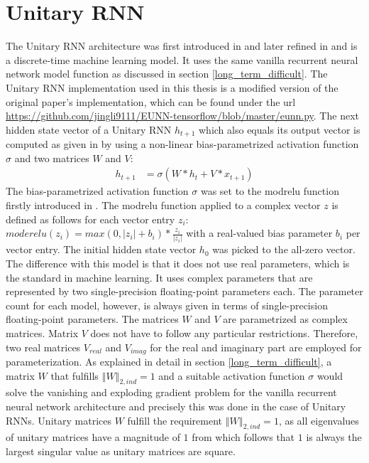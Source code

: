 \documentclass[draft,final]{vutinfth} %
\begin{document}
    \section{Unitary RNN} \label{urnn}
    The Unitary RNN architecture was first introduced in \cite{UnitaryRNNs} and later refined in \cite{EfficientUnitaryRNNs} and is a discrete-time machine learning model.
    It uses the same vanilla recurrent neural network model function as discussed in section \ref{long_term_difficult}.
    The Unitary RNN implementation used in this thesis is a modified version of the original paper's implementation, which can be found under the url \url{https://github.com/jingli9111/EUNN-tensorflow/blob/master/eunn.py}.
    The next hidden state vector of a Unitary RNN $h_{t+1}$ which also equals its output vector is computed as given in \cite[p. 2]{EfficientUnitaryRNNs} by using a non-linear bias-parametrized activation function $\sigma$ and two matrices $W$ and $V$:
    \begin{align}
    \label{urnn_state}
    h_{t+1} &= \sigma(W*h_t + V*x_{t+1})
    \end{align}
    The bias-parametrized activation function $\sigma$ was set to the modrelu function firstly introduced in \cite[p. 4]{UnitaryRNNs}.
    The modrelu function applied to a complex vector $z$ is defined as follows for each vector entry $z_i$: $moderelu(z_i) = max(0, |z_i|+b_i) * \frac{z_i}{|z_i|}$ with a real-valued bias parameter $b_i$ per vector entry.
    The initial hidden state vector $h_0$ was picked to the all-zero vector.
    The difference with this model is that it does not use real parameters, which is the standard in machine learning.
    It uses complex parameters that are represented by two single-precision floating-point parameters each. 
    The parameter count for each model, however, is always given in terms of single-precision floating-point parameters.
    The matrices $W$ and $V$ are parametrized as complex matrices. 
    Matrix $V$ does not have to follow any particular restrictions. Therefore, two real matrices $V_{real}$ and $V_{imag}$ for the real and imaginary part are employed for parameterization. 
    As explained in detail in section \ref{long_term_difficult}, a matrix $W$ that fulfills $\left\Vert W \right\Vert_{2,ind} = 1$ and a suitable activation function $\sigma$ would solve the vanishing and exploding gradient problem for the vanilla recurrent neural network architecture and precisely this was done in the case of Unitary RNNs. 
    Unitary matrices $W$ fulfill the requirement $\left\Vert W \right\Vert_{2,ind} = 1$, as all eigenvalues of unitary matrices have a magnitude of $1$ from which follows that $1$ is always the largest singular value as unitary matrices are square. 
\end{document}
